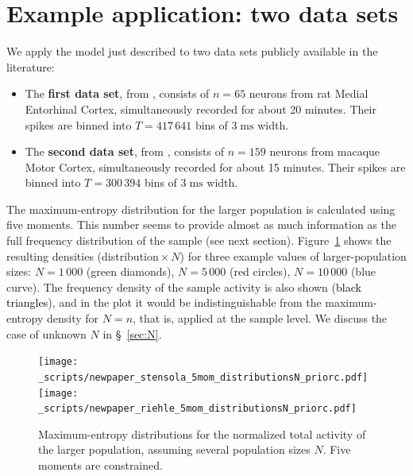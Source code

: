 \documentclass[\ifafour a4paper,12pt,\else a5paper,10pt,\fi%
onecolumn,oneside,article,%
british%
]{memoir}
\theoremstyle{remark}
\theoremstyle{innote}
\renewcommand*{\|}{\nonscript\,\vert\nonscript\;\mathopen{}}
\newcommand*{\sect}{\S}%
\newcommand*{\yAv}{A}
\newcommand*{\yA}{\yAv}%
\newcommand*{\px}{P_{\text{me}}}
\begin{document}
\section{Example application: two data sets}
\label{sec:application}

We apply the model just described to two data sets publicly available in
the literature:
\begin{itemize}[wide]
\item The \textbf{first data set}, from \textcite[rat
  14147]{stensolaetal2012}, consists of $n=65$ neurons from rat Medial
  Entorhinal Cortex, simultaneously recorded for about 20 minutes. Their
  spikes are binned into $T=417\,641$ bins of $3\;\textrm{ms}$ width.
\item The \textbf{second data set}, from \textcite[data courtesy by A.
  Riehle and T. Brochier]{rostamietal2016_r2017}, %
  consists of $n=159$ neurons from macaque Motor Cortex, simultaneously
  recorded for about 15 minutes. Their spikes are binned into $T=300\,394$
  bins of $3\;\textrm{ms}$ width.
\end{itemize}


\bigskip

The maximum-entropy distribution for the larger population is calculated
using five moments. This number seems to provide almost as much information
as the full frequency distribution of the sample (see next section).
Figure~\ref{fig:plots_5mom} shows the resulting densities
(distribution${}\times N$) for three example values of larger-population
sizes: $N=1\,000$ (\textcolor{mygreen}{green diamonds}), $N=5\,000$
(\textcolor{myred}{red circles}), $N=10\,000$ (\textcolor{myblue}{blue
  curve}). The frequency density of the sample activity is also shown
(\textcolor{black}{black triangles}), and in the plot it would be
indistinguishable from the maximum-entropy density for $N=n$, that is,
applied at the sample level. We discuss the case of unknown $N$ in
\sect~\ref{sec:N}.
\begin{figure}[!p]
  \centering
\subcaption[]{\label{fig:plots_5mom_a}}%
\texttt{[image: \_scripts/newpaper\_stensola\_5mom\_distributionsN\_priorc.pdf]}%
\\[2em]%
\subcaption[]{\label{fig:plots_5mom_b}}%
\texttt{[image: \_scripts/newpaper\_riehle\_5mom\_distributionsN\_priorc.pdf]}%
\\[2em]%
\caption{Maximum-entropy distributions for the normalized total activity of
  the larger population, assuming several population sizes $N$. Five
  moments are constrained.}
\label{fig:plots_5mom}
\end{figure}
\end{document}
